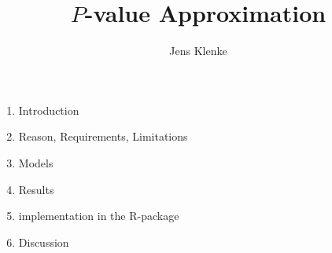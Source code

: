 \documentclass[a4paper, 12pt]{article}
\title{$P$-value Approximation}
\author{Jens Klenke}
\date{}
\begin{document}
 

\maketitle
\begin{enumerate}
	\item Introduction
	\item Reason, Requirements, Limitations
	\item Models 
	\item Results 
	\item implementation in the R-package
	\item Discussion
\end{enumerate}

\end{document}
